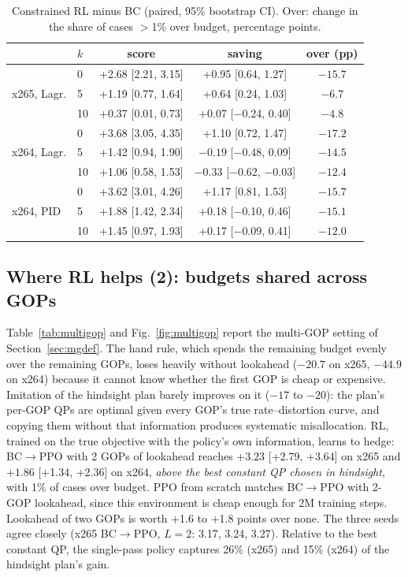 \documentclass[conference]{IEEEtran}
\newcommand{\bcppo}{BC$\to$PPO}
\begin{document}
\begin{table}[t]
\centering\footnotesize
\caption{Constrained RL minus BC (paired, 95\% bootstrap CI). Over: change in the share of cases $>$1\% over budget, percentage points.}
\label{tab:constraint}
\setlength{\tabcolsep}{2.5pt}
\begin{tabular}{@{}llccc@{}}
\toprule
 & $k$ & score & saving & over (pp)\\
\midrule
\multirow{3}{*}{x265, Lagr.} & 0 & +2.68 [2.21, 3.15] & +0.95 [0.64, 1.27] & $-15.7$\\
 & 5 & +1.19 [0.77, 1.64] & +0.64 [0.24, 1.03] & $-6.7$\\
 & 10 & +0.37 [0.01, 0.73] & +0.07 [$-$0.24, 0.40] & $-4.8$\\
\midrule
\multirow{3}{*}{x264, Lagr.} & 0 & +3.68 [3.05, 4.35] & +1.10 [0.72, 1.47] & $-17.2$\\
 & 5 & +1.42 [0.94, 1.90] & $-0.19$ [$-$0.48, 0.09] & $-14.5$\\
 & 10 & +1.06 [0.58, 1.53] & $-0.33$ [$-$0.62, $-$0.03] & $-12.4$\\
\midrule
\multirow{3}{*}{x264, PID} & 0 & +3.62 [3.01, 4.26] & +1.17 [0.81, 1.53] & $-15.7$\\
 & 5 & +1.88 [1.42, 2.34] & +0.18 [$-$0.10, 0.46] & $-15.1$\\
 & 10 & +1.45 [0.97, 1.93] & +0.17 [$-$0.09, 0.41] & $-12.0$\\
\bottomrule
\end{tabular}
\end{table}

\subsection{Where RL helps (2): budgets shared across GOPs}\label{sec:multigop}
Table~\ref{tab:multigop} and Fig.~\ref{fig:multigop} report the multi-GOP setting of Section~\ref{sec:mgdef}. The hand rule, which spends the remaining budget evenly over the remaining GOPs, loses heavily without lookahead ($-20.7$ on x265, $-44.9$ on x264) because it cannot know whether the first GOP is cheap or expensive. Imitation of the hindsight plan barely improves on it ($-17$ to $-20$): the plan's per-GOP QPs are optimal given every GOP's true rate--distortion curve, and copying them without that information produces systematic misallocation. RL, trained on the true objective with the policy's own information, learns to hedge: \bcppo{} with 2 GOPs of lookahead reaches $+3.23$ [+2.79, +3.64] on x265 and $+1.86$ [+1.34, +2.36] on x264, \emph{above the best constant QP chosen in hindsight}, with 1\% of cases over budget. PPO from scratch matches \bcppo{} with 2-GOP lookahead, since this environment is cheap enough for 2M training steps. Lookahead of two GOPs is worth +1.6 to +1.8 points over none. The three seeds agree closely (x265 \bcppo, $L{=}2$: 3.17, 3.24, 3.27). Relative to the best constant QP, the single-pass policy captures 26\% (x265) and 15\% (x264) of the hindsight plan's gain.
\end{document}
